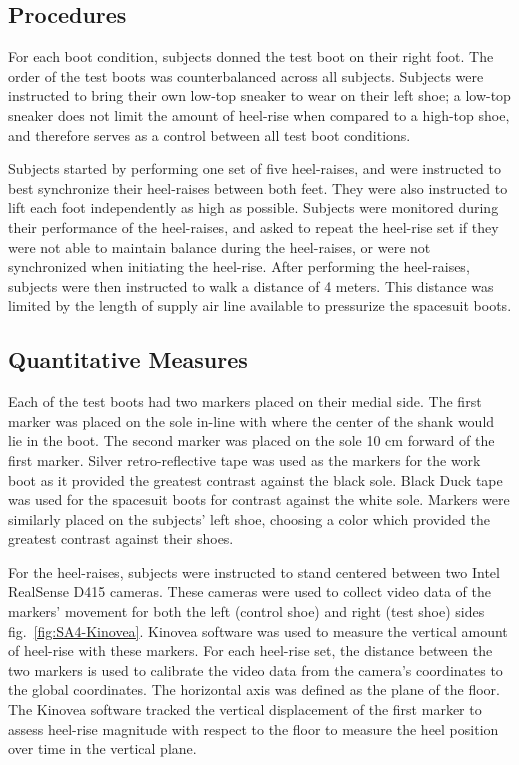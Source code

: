 \documentclass[defaultstyle,11pt]{thesis}
\begin{document}
\hypertarget{procedures}{%
\subsection{Procedures}\label{procedures}}

For each boot condition, subjects donned the test boot on their right foot.
The order of the test boots was counterbalanced across all subjects.
Subjects were instructed to bring their own low-top sneaker to wear on their left shoe; a low-top sneaker does not limit the amount of heel-rise when compared to a high-top shoe, and therefore serves as a control between all test boot conditions.

Subjects started by performing one set of five heel-raises, and were instructed to best synchronize their heel-raises between both feet.
They were also instructed to lift each foot independently as high as possible.
Subjects were monitored during their performance of the heel-raises, and asked to repeat the heel-rise set if they were not able to maintain balance during the heel-raises, or were not synchronized when initiating the heel-rise.
After performing the heel-raises, subjects were then instructed to walk a distance of 4 meters.
This distance was limited by the length of supply air line available to pressurize the spacesuit boots.

\hypertarget{quantitative-measures}{%
\subsection{Quantitative Measures}\label{quantitative-measures}}

Each of the test boots had two markers placed on their medial side.
The first marker was placed on the sole in-line with where the center of the shank would lie in the boot.
The second marker was placed on the sole 10 cm forward of the first marker.
Silver retro-reflective tape was used as the markers for the work boot as it provided the greatest contrast against the black sole.
Black Duck tape was used for the spacesuit boots for contrast against the white sole.
Markers were similarly placed on the subjects' left shoe, choosing a color which provided the greatest contrast against their shoes.

For the heel-raises, subjects were instructed to stand centered between two Intel RealSense D415 cameras.
These cameras were used to collect video data of the markers' movement for both the left (control shoe) and right (test shoe) sides fig.~\ref{fig:SA4-Kinovea}.
Kinovea software was used to measure the vertical amount of heel-rise with these markers.
For each heel-rise set, the distance between the two markers is used to calibrate the video data from the camera's coordinates to the global coordinates.
The horizontal axis was defined as the plane of the floor.
The Kinovea software tracked the vertical displacement of the first marker to assess heel-rise magnitude with respect to the floor to measure the heel position over time in the vertical plane.
\end{document}
